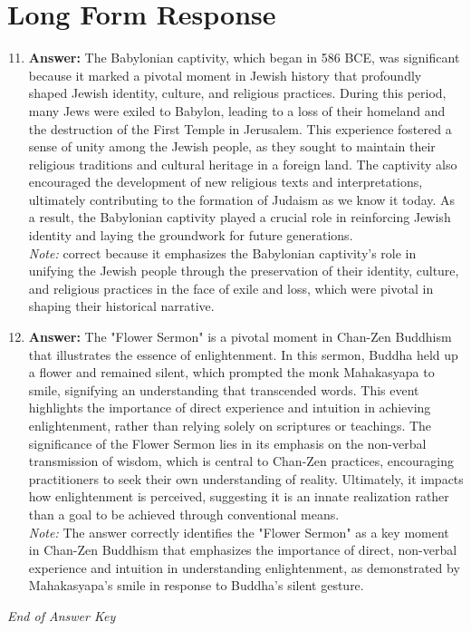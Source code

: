 \documentclass[12pt]{article}
\begin{document}
\section*{Long Form Response}
\begin{enumerate}[label=\arabic*.]
\setcounter{enumi}{10}
\item \textbf{Answer:} The Babylonian captivity, which began in 586 BCE, was significant because it marked a pivotal moment in Jewish history that profoundly shaped Jewish identity, culture, and religious practices. During this period, many Jews were exiled to Babylon, leading to a loss of their homeland and the destruction of the First Temple in Jerusalem. This experience fostered a sense of unity among the Jewish people, as they sought to maintain their religious traditions and cultural heritage in a foreign land. The captivity also encouraged the development of new religious texts and interpretations, ultimately contributing to the formation of Judaism as we know it today. As a result, the Babylonian captivity played a crucial role in reinforcing Jewish identity and laying the groundwork for future generations.
\\ \textit{Note:} correct because it emphasizes the Babylonian captivity's role in unifying the Jewish people through the preservation of their identity, culture, and religious practices in the face of exile and loss, which were pivotal in shaping their historical narrative.
\item \textbf{Answer:} The "Flower Sermon" is a pivotal moment in Chan-Zen Buddhism that illustrates the essence of enlightenment. In this sermon, Buddha held up a flower and remained silent, which prompted the monk Mahakasyapa to smile, signifying an understanding that transcended words. This event highlights the importance of direct experience and intuition in achieving enlightenment, rather than relying solely on scriptures or teachings. The significance of the Flower Sermon lies in its emphasis on the non-verbal transmission of wisdom, which is central to Chan-Zen practices, encouraging practitioners to seek their own understanding of reality. Ultimately, it impacts how enlightenment is perceived, suggesting it is an innate realization rather than a goal to be achieved through conventional means.
\\ \textit{Note:} The answer correctly identifies the "Flower Sermon" as a key moment in Chan-Zen Buddhism that emphasizes the importance of direct, non-verbal experience and intuition in understanding enlightenment, as demonstrated by Mahakasyapa's smile in response to Buddha's silent gesture.
\end{enumerate}

\vfill
\noindent\textit{End of Answer Key}
\end{document}
